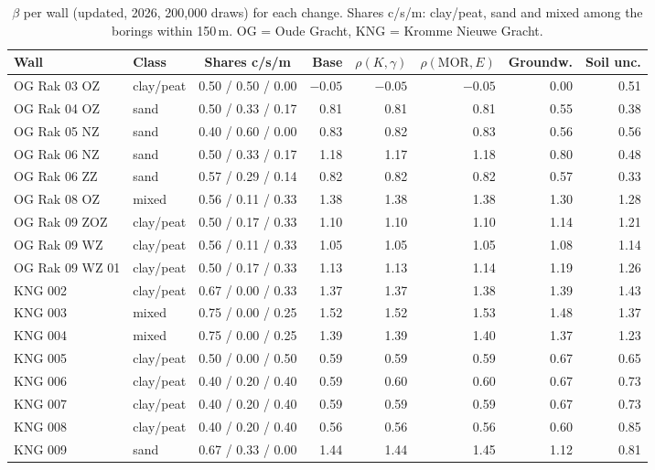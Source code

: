 \begin{table}[htbp]
\centering
\small
\caption{$\beta$ per wall (updated, 2026, 200{,}000 draws) for each change.
Shares c/s/m: clay/peat, sand and mixed among the borings within 150\,m.
OG = Oude Gracht, KNG = Kromme Nieuwe Gracht.}
\label{tab:sens-walls}
\setlength{\tabcolsep}{4pt}
\begin{tabular}{@{}l l c r r r r r@{}}
\toprule
Wall & Class & Shares c/s/m & Base & $\rho(K,\gamma)$ & $\rho(\text{MOR},E)$ & Groundw. & Soil unc. \\
\midrule
OG Rak 03 OZ & clay/peat & 0.50 / 0.50 / 0.00 & $-0.05$ & $-0.05$ & $-0.05$ & 0.00 & 0.51 \\
OG Rak 04 OZ & sand & 0.50 / 0.33 / 0.17 & 0.81 & 0.81 & 0.81 & 0.55 & 0.38 \\
OG Rak 05 NZ & sand & 0.40 / 0.60 / 0.00 & 0.83 & 0.82 & 0.83 & 0.56 & 0.56 \\
OG Rak 06 NZ & sand & 0.50 / 0.33 / 0.17 & 1.18 & 1.17 & 1.18 & 0.80 & 0.48 \\
OG Rak 06 ZZ & sand & 0.57 / 0.29 / 0.14 & 0.82 & 0.82 & 0.82 & 0.57 & 0.33 \\
OG Rak 08 OZ & mixed & 0.56 / 0.11 / 0.33 & 1.38 & 1.38 & 1.38 & 1.30 & 1.28 \\
OG Rak 09 ZOZ & clay/peat & 0.50 / 0.17 / 0.33 & 1.10 & 1.10 & 1.10 & 1.14 & 1.21 \\
OG Rak 09 WZ & clay/peat & 0.56 / 0.11 / 0.33 & 1.05 & 1.05 & 1.05 & 1.08 & 1.14 \\
OG Rak 09 WZ 01 & clay/peat & 0.50 / 0.17 / 0.33 & 1.13 & 1.13 & 1.14 & 1.19 & 1.26 \\
KNG 002 & clay/peat & 0.67 / 0.00 / 0.33 & 1.37 & 1.37 & 1.38 & 1.39 & 1.43 \\
KNG 003 & mixed & 0.75 / 0.00 / 0.25 & 1.52 & 1.52 & 1.53 & 1.48 & 1.37 \\
KNG 004 & mixed & 0.75 / 0.00 / 0.25 & 1.39 & 1.39 & 1.40 & 1.37 & 1.23 \\
KNG 005 & clay/peat & 0.50 / 0.00 / 0.50 & 0.59 & 0.59 & 0.59 & 0.67 & 0.65 \\
KNG 006 & clay/peat & 0.40 / 0.20 / 0.40 & 0.59 & 0.60 & 0.60 & 0.67 & 0.73 \\
KNG 007 & clay/peat & 0.40 / 0.20 / 0.40 & 0.59 & 0.59 & 0.59 & 0.67 & 0.73 \\
KNG 008 & clay/peat & 0.40 / 0.20 / 0.40 & 0.56 & 0.56 & 0.56 & 0.60 & 0.85 \\
KNG 009 & sand & 0.67 / 0.33 / 0.00 & 1.44 & 1.44 & 1.45 & 1.12 & 0.81 \\
\bottomrule
\end{tabular}
\end{table}

